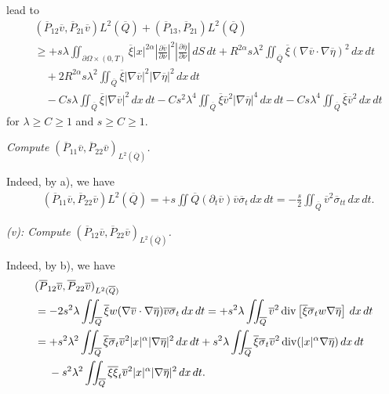 \documentclass[11pt]{article}
\numberwithin{equation}{section}
\DeclareMathOperator{\Div}{div}
\begin{document}
lead to
\begin{equation}\label{12.24.2}
	\begin{split}
		&(\overline{P}_{12}\overline{v}, \overline{P}_{21}\overline{v}){L^2(\overline{Q})}+(\overline{P}_{13}, \overline{P}_{21}){L^2(\overline{Q})}\\
		&\geq +s\lambda\iint_{\partial\Omega\times (0,T)}\overline{\xi}|x|^{2\alpha}\left|\frac{\partial \overline{v}}{\partial \nu}\right|^2\left|\frac{\partial \overline{\eta}}{\partial \nu}\right|\,dS\,dt + R^{2\alpha}s\lambda^2\iint_{\overline{Q}}\overline{\xi}(\nabla \overline{v} \cdot\nabla \overline{\eta})^2\,dx\,dt\\
		&\quad + 2R^{2\alpha}s\lambda^2\iint_{\overline{Q}}\overline{\xi} |\nabla \overline{v}|^2|\nabla \overline{\eta}|^2\,dx\,dt\\
		&\quad - Cs\lambda\iint_{\overline{Q}}\overline{\xi} |\nabla \overline{v}|^2\,dx\,dt - Cs^2\lambda^4\iint_{\overline{Q}}\overline{\xi} \overline{v}^2|\nabla \overline{\eta}|^4\,dx\,dt - Cs\lambda^4\iint_{\overline{Q}}\overline{\xi} \overline{v}^2\,dx\,dt
	\end{split}
\end{equation}
for $\lambda\geq C\geq 1$ and $s\geq C\geq 1$.

{\it Compute $(\overline{P}_{11}\overline{v}, \overline{P}_{22} \overline{v})_{L^2(\overline{Q})}$.}

Indeed, by a), we have
\begin{equation*}
	\begin{split}
		&(\overline{P}_{11}\overline{v}, \overline{P}_{22} \overline{v}){L^2(\overline{Q})}=+s \iint{\overline{Q}}(\partial_t\overline{v})\overline{v}\overline{\sigma}_t\,dx\,dt=-\frac{s}{2}\iint_{\overline{Q}}\overline{v}^2\overline{\sigma}_{tt}\,dx\,dt.
	\end{split}
\end{equation*}

{\it (v): Compute $(\overline{P}_{12}\overline{v}, \overline{P}_{22}\overline{v})_{L^2(\overline{Q})}$.}

Indeed, by b), we have
\begin{equation*}
	\begin{split}
		&(\overline{P}_{12}\overline{v}, \overline{P}_{22}\overline{v})_{L^2(\overline{Q})}\\
		&=-2s^2\lambda \iint_{\overline{Q}}\overline{\xi} w(\nabla \overline{v}\cdot \nabla \overline{\eta}) \overline{v} \overline{\sigma}_t\,dx\,dt =+s^2\lambda\iint_{\overline{Q}}\overline{v}^2\Div\left[\overline{\xi} \overline{\sigma}_t w\nabla \overline{\eta}\right]\,dx\,dt\\
		&=+s^2\lambda^2\iint_{\overline{Q}}\overline{\xi} \overline{\sigma}_t \overline{v}^2|x|^\alpha  |\nabla \overline{\eta}|^2 \,dx\,dt+s^2\lambda\iint_{\overline{Q}}\overline{\xi} \overline{\sigma}_t\overline{v}^2\Div(|x|^\alpha \nabla \overline{\eta})\,dx\,dt\\
		&\hspace{4.5mm}-s^2\lambda^2\iint_{\overline{Q}}\overline{\xi}\overline{\xi}_t \overline{v}^2|x|^\alpha |\nabla \overline{\eta}|^2\,dx\,dt.
	\end{split}
\end{equation*}
\end{document}
